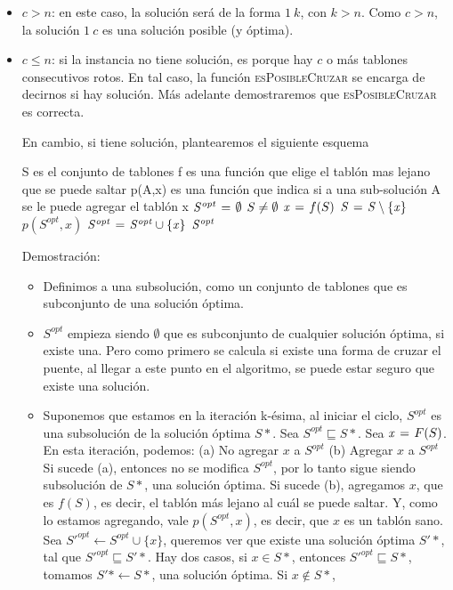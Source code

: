 \begin{itemize}
  \item $c > n$: en este caso, la solución será de la forma $1 \ k$, con $k > n$. Como $c > n$, la
  solución $1 \ c$ es una solución posible (y óptima).

  \item $c \leq n$: si la instancia no tiene solución, es porque hay $c$ o más tablones 
  consecutivos rotos. En tal caso, la función \textsc{esPosibleCruzar} se encarga de 
  decirnos si hay solución. Más adelante demostraremos que \textsc{esPosibleCruzar} 
  es correcta. \medskip
  
  En cambio, si tiene solución, plantearemos el siguiente esquema
  
  \begin{codebox}
  \li \Comment S es el conjunto de tablones
  \li \Comment f es una función que elige el tablón mas lejano que se puede saltar
  \li \Comment p(A,x) es una función que indica si a una sub-solución A se le puede agregar el tablón x 
  \li $\id{S^{opt}} \gets \emptyset$
  \li \While $\id{S} \neq \emptyset$
  \li     \Do
    			$\id{x} \gets f(S)$
  \li  			$\id{S} \gets \id{S} \setminus \{\id{x}\}$
  \li			\If $p(S^{opt}, x)$
  \li				\Then
    					$\id{S^{opt}} \gets \id{S^{opt}} \cup \{\id{x}\}$
    				\End
    		\End
  \li \Return $\id{S^{opt}}$  
  \end{codebox}

  Demostración:
  \begin{itemize}
    \item Definimos a una subsolución, como un conjunto de tablones que
    es subconjunto de una solución óptima.
    \item $S^{opt}$ empieza siendo $\emptyset$ que es subconjunto de cualquier
    solución óptima, si existe una. Pero como primero se calcula si
    existe una forma de cruzar el puente, al llegar a este punto en el
    algoritmo, se puede estar seguro que existe una solución.
    \item Suponemos que estamos en la iteración k-ésima, al iniciar
    el ciclo, $S^{opt}$ es una subsolución de la solución óptima $S*$.
    Sea $S^{opt} \sqsubseteq S*$.
    Sea $\id{x} \gets F(S)$.
    En esta iteración, podemos:
    (a) No agregar $x$ a $S^{opt}$
    (b) Agregar $x$ a $S^{opt}$
    Si sucede (a), entonces no se modifica $S^{opt}$, por lo tanto sigue
    siendo subsolución de $S*$, una solución óptima.
    Si sucede (b), agregamos $x$, que es $f(S)$, es decir, el tablón más
    lejano al cuál se puede saltar. Y, como lo estamos agregando, vale
    $p(S^{opt}, x)$, es decir, que $x$ es un tablón sano.
    Sea $S'^{opt} \gets S^{opt} \cup \{x\}$, queremos ver que existe una
    solución óptima $S'*$, tal que $S'^{opt} \sqsubseteq S'*$.
    Hay dos casos, si $x \in S*$, entonces $S'^{opt} \sqsubseteq S*$, 
    tomamos $S'* \gets S*$, una solución óptima.
    Si $x \notin S*$, 
    
  \end{itemize}

\end{itemize}





